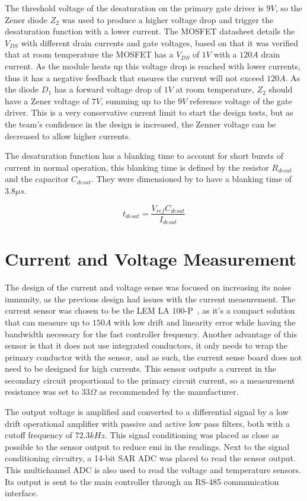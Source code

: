 The threshold voltage of the desaturation on the primary gate driver is $9V$, so the Zener diode $Z_2$ was used to produce a higher voltage drop and trigger the desaturation function with a lower current. The MOSFET datasheet details the $V_{DS}$ with different drain currents and gate voltages, based on that it was verified that at room temperature the MOSFET has a $V_{DS}$ of $1V$ with a $120A$ drain current. As the module heats up this voltage drop is reached with lower currents, thus it has a negative feedback that ensures the current will not exceed $120A$. As the diode $D_1$ has a forward voltage drop of $1V$ at room temperature, $Z_2$ should have a Zener voltage of $7V$, summing up to the $9V$ reference voltage of the gate driver. This is a very conservative current limit to start the design tests, but as the team's confidence in the design is increased, the Zenner voltage can be decreased to allow higher currents. 

The desaturation function has a blanking time to account for short bursts of current in normal operation, this blanking time is defined by the resistor $R_{desat}$ and the capacitor $C_{desat}$. They were dimensioned by  to have a blanking time of $3.8\mu s$. 

\begin {equation}
	t_{desat} = \frac{V_{ref} C_{desat}}{I_{desat}}
	\label{eq:desat_time}
\end{equation}
\section{Current and Voltage Measurement}

The design of the current and voltage sense was focused on increasing its noise immunity, as the previous design had issues with the current measurement. The current sensor was chosen to be the LEM LA 100-P~\cite{LEM:Current_sensor_datahseet:2018}, as it's a compact solution that can measure up to $150A$ with low drift and linearity error while having the bandwidth necessary for the fast controller frequency. Another advantage of this sensor is that it does not use integrated conductors, it only needs to wrap the primary conductor with the sensor, and as such, the current sense board does not need to be designed for high currents. This sensor outputs a current in the secondary circuit proportional to the primary circuit current, so a measurement resistance was set to $33\Omega$ as recommended by the manufacturer.

The output voltage is amplified and converted to a differential signal by a low drift operational amplifier with passive and active low pass filters, both with a cutoff frequency of $72.3kHz$. This signal conditioning was placed as close as possible to the sensor output to reduce \gls{emi} in the readings. Next to the signal conditioning circuitry, a 14-bit SAR ADC was placed to read the sensor output. This multichannel ADC is also used to read the voltage and temperature sensors. Its output is sent to the main controller through an RS-485 communication interface.

